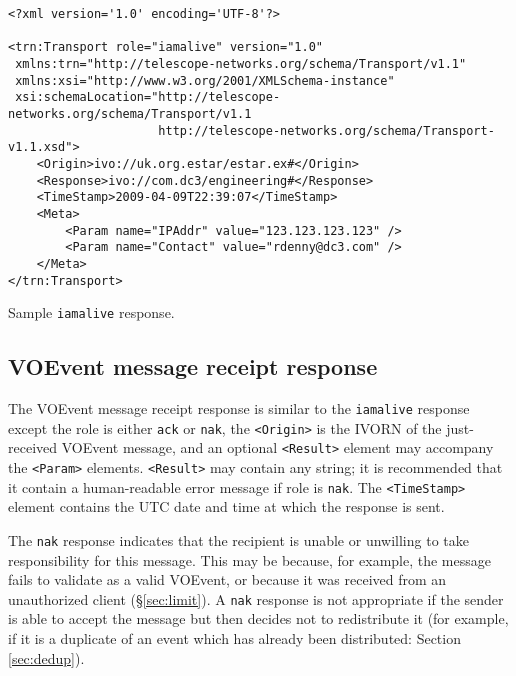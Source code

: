 \documentclass[a4paper,11pt]{ivoa}
\begin{document}
\begin{listing*}
\begin{verbatim}
<?xml version='1.0' encoding='UTF-8'?>

<trn:Transport role="iamalive" version="1.0"
 xmlns:trn="http://telescope-networks.org/schema/Transport/v1.1"
 xmlns:xsi="http://www.w3.org/2001/XMLSchema-instance"
 xsi:schemaLocation="http://telescope-networks.org/schema/Transport/v1.1
                     http://telescope-networks.org/schema/Transport-v1.1.xsd">
    <Origin>ivo://uk.org.estar/estar.ex#</Origin>
    <Response>ivo://com.dc3/engineering#</Response>
    <TimeStamp>2009-04-09T22:39:07</TimeStamp>
    <Meta>
        <Param name="IPAddr" value="123.123.123.123" />
        <Param name="Contact" value="rdenny@dc3.com" />
    </Meta>
</trn:Transport>
\end{verbatim}
\caption{Sample \texttt{iamalive} response.}
\label{lst:iamaliveresponse}
\end{listing*}

\subsection{VOEvent message receipt response}

The VOEvent message receipt response is similar to the \texttt{iamalive}
response except the role is either \texttt{ack} or \texttt{nak}, the
\texttt{<Origin>} is the IVORN of the just-received VOEvent message, and an
optional \texttt{<Result>} element may accompany the \texttt{<Param>}
elements. \texttt{<Result>} may contain any string; it is recommended that it
contain a human-readable error message if role is \texttt{nak}. The
\texttt{<TimeStamp>} element contains the UTC date and time at which the
response is sent.

The \texttt{nak} response indicates that the recipient is unable or unwilling
to take responsibility for this message. This may be because, for example, the
message fails to validate as a valid VOEvent, or because it was received from
an unauthorized client (\S\ref{sec:limit}). A \texttt{nak} response is not
appropriate if the sender is able to accept the message but then decides not
to redistribute it (for example, if it is a duplicate of an event which has
already been distributed: Section \ref{sec:dedup}).
\end{document}
